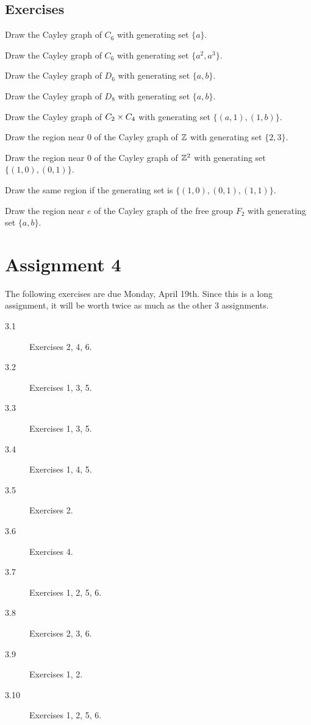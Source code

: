 \subsection*{Exercises}

\begin{exercises}
  \item Draw the Cayley graph of $C_{6}$ with generating set $\{a\}$.
  
    Draw the Cayley graph of $C_{6}$ with generating set $\{a^{2}, a^{3}\}$.

  \item Draw the Cayley graph of $D_{6}$ with generating set $\{a,b\}$.

  \item Draw the Cayley graph of $D_{8}$ with generating set $\{a,b\}$.

  \item Draw the Cayley graph of $C_{2} \times C_{4}$ with generating set 
  $\{(a,1), (1,b)\}$.

  \item Draw the region near $0$ of the Cayley graph of $\mathbb{Z}$ with
    generating set $\{2, 3\}$.

  \item Draw the region near $0$ of the Cayley graph of $\mathbb{Z}^{2}$ with
    generating set $\{(1,0), (0,1)\}$.
    
    Draw the same region if the generating set is $\{(1,0), (0,1), 
    (1,1)\}$.
  
  \item Draw the region near $e$ of the Cayley graph of the free
    group $F_{2}$ with generating set $\{a, b\}$.
\end{exercises}


\newpage
\section*{Assignment 4}

The following exercises are due Monday, April 19th.  Since this is a
long assignment, it will be worth twice as much as the other 3 assignments.

\begin{description}
  \item[3.1] Exercises 2, 4, 6.
  \item[3.2] Exercises 1, 3, 5.
  \item[3.3] Exercises 1, 3, 5.
  \item[3.4] Exercises 1, 4, 5.
  \item[3.5] Exercises 2.
  \item[3.6] Exercises 4.
  \item[3.7] Exercises 1, 2, 5, 6.
  \item[3.8] Exercises 2, 3, 6.
  \item[3.9] Exercises 1, 2.
  \item[3.10] Exercises 1, 2, 5, 6.
\end{description}


